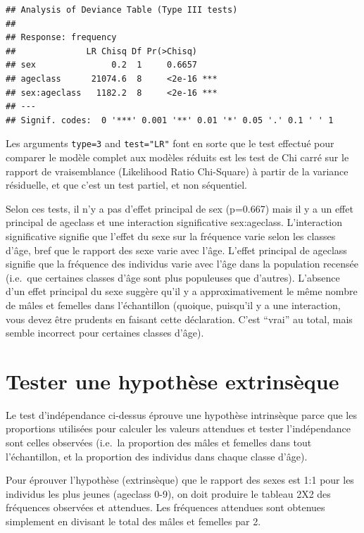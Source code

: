 \documentclass[12pt,]{book}
\begin{document}
\begin{verbatim}
## Analysis of Deviance Table (Type III tests)
## 
## Response: frequency
##              LR Chisq Df Pr(>Chisq)    
## sex               0.2  1     0.6657    
## ageclass      21074.6  8     <2e-16 ***
## sex:ageclass   1182.2  8     <2e-16 ***
## ---
## Signif. codes:  0 '***' 0.001 '**' 0.01 '*' 0.05 '.' 0.1 ' ' 1
\end{verbatim}

Les arguments \texttt{type=3} and \texttt{test="LR"} font en sorte que le test effectué pour comparer le modèle complet aux modèles réduits est les test de Chi carré sur le rapport de vraisemblance (Likelihood Ratio Chi-Square) à partir de la variance résiduelle, et que c'est un test partiel, et non séquentiel.

Selon ces tests, il n'y a pas d'effet principal de sex (p=0.667) mais il y a un effet principal de ageclass et une interaction significative sex:ageclass. L'interaction significative signifie que l'effet du sexe sur la fréquence varie selon les classes d'âge, bref que le rapport des sexe varie avec l'âge. L'effet principal de ageclass signifie que la fréquence des individus varie avec l'âge dans la population recensée (i.e.~que certaines classes d'âge sont plus populeuses que d'autres). L'absence d'un effet principal du sexe suggère qu'il y a approximativement le même nombre de mâles et femelles dans l'échantillon (quoique, puisqu'il y a une interaction, vous devez être prudents en faisant cette déclaration. C'est ``vrai'' au total, mais semble incorrect pour certaines classes d'âge).

\hypertarget{tester-une-hypothuxe8se-extrinsuxe8que}{%
\section{Tester une hypothèse extrinsèque}\label{tester-une-hypothuxe8se-extrinsuxe8que}}

Le test d'indépendance ci-dessus éprouve une hypothèse intrinsèque parce que les proportions utilisées pour calculer les valeurs attendues et tester l'indépendance sont celles observées (i.e.~la proportion des mâles et femelles dans tout l'échantillon, et la proportion des individus dans chaque classe d'âge).

Pour éprouver l'hypothèse (extrinsèque) que le rapport des sexes est 1:1 pour les individus les plus jeunes (ageclass 0-9), on doit produire le tableau 2X2 des fréquences observées et attendues. Les fréquences attendues sont obtenues simplement en divisant le total des mâles et femelles par 2.
\end{document}
